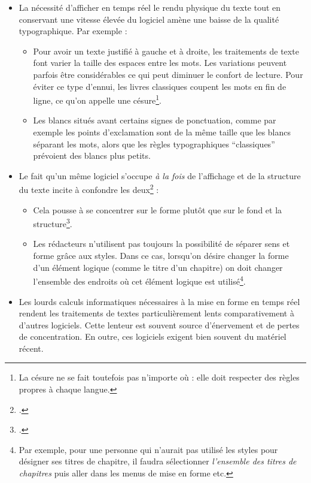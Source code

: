 \begin{itemize}
\item La nécessité d'afficher en temps réel le rendu physique du texte tout en conservant une vitesse élevée du logiciel amène une baisse de la qualité typographique. Par exemple :
	\begin{itemize}
		\item Pour avoir un texte justifié à gauche et à droite, les traitements de texte font varier la taille des espaces entre les mots. Les variations peuvent parfois être considérables ce qui peut diminuer le confort de lecture. Pour éviter ce type d'ennui, les livres classiques coupent les mots en fin de ligne, ce qu'on appelle une césure\footnote{La césure ne se fait toutefois pas n'importe où : elle doit respecter des règles propres à chaque langue.}.
		\item Les blancs situés avant certains signes de ponctuation, comme par exemple les points d'exclamation sont de  la même taille que les blancs séparant les mots, alors que les règles typographiques \enquote{classiques} prévoient des blancs plus petits.
	\end{itemize}
\item Le fait qu'un même logiciel s'occupe \emph{à la fois} de l'affichage et de la structure du texte incite à confondre les deux\footcite[L'auteur de ces lignes est moins sévère envers les traitements de texte que d'autres LaTeXiens : \cf][]{stupide}  :
	\begin{itemize}
		\item Cela pousse à se concentrer sur le forme plutôt que sur le fond et la structure\footcite[Toutefois en théorie la formation universitaire en sciences humaines incite à penser \emph{structure et sens d'abord}. Voir un débat sur le blog de l'auteur :][]{structurevsforme}. 
		\item Les rédacteurs n'utilisent pas toujours la possibilité de séparer sens et forme grâce aux styles. Dans ce cas, lorsqu'on désire changer la forme d'un élément logique (comme  le titre d'un chapitre) on doit changer l'ensemble des endroits où cet élément logique est utilisé\footnote{Par exemple, pour une personne  qui n'aurait pas utilisé les styles pour désigner ses titres de chapitre, il faudra sélectionner \emph{l'ensemble des titres de chapitres} puis aller dans les menus de mise en forme etc.}.
	\end{itemize}

\item Les lourds calculs informatiques nécessaires à la mise en forme en temps réel rendent les traitements de textes particulièrement lents comparativement à d'autres logiciels. Cette lenteur est souvent source d'énervement et de pertes de concentration. En outre, ces logiciels exigent bien souvent du matériel récent.
\end{itemize}

